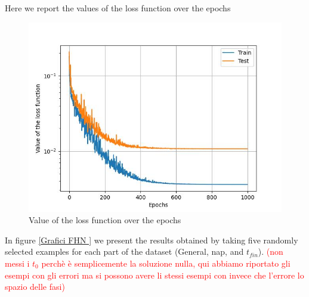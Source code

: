 \documentclass{article}
\begin{document}
Here we report the values of the loss function over the epochs
\begin{center}
    \begin{figure}[ht]
        \centering
        \includegraphics[width=0.5\linewidth]{images/loss_function_FHN.jpg}
        \caption{Value of the loss function over the epochs}
        \label{fig:loss_FHN_FNO}
    \end{figure}
\end{center}
In figure \ref{Grafici FHN } we present the results obtained by taking five randomly selected examples for each part of the dataset (General, nap, and $t_{fin}$). \textcolor{red}{(non messi i $t_0$ perchè è semplicemente la soluzione nulla, qui abbiamo riportato gli esempi con gli errori ma si possono avere li stessi esempi con invece che l'errore lo spazio delle fasi)}
\end{document}
